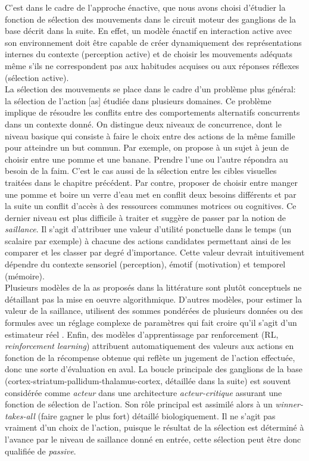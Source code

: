C'est dans le cadre de l'approche énactive, que nous avons choisi d'étudier la fonction de sélection des mouvements dans le circuit moteur des ganglions de la base décrit dans la suite. En effet, un modèle énactif en interaction active avec son environnement doit être capable de créer dynamiquement des représentations internes du contexte (perception active) et de choisir les mouvements adéquats même s'ils ne correspondent pas aux habitudes acquises ou aux réponses réflexes (sélection active).\\ 

La sélection des mouvements se place dans le cadre d'un problème plus général: la sélection de l'action [\gls{as}] étudiée dans plusieurs domaines. Ce problème implique de résoudre les conflits entre des comportements alternatifs concurrents dans un contexte donné. On distingue deux niveaux de concurrence, dont le niveau basique qui consiste à faire le choix entre des actions de la même famille pour atteindre un but commun. Par exemple, on propose à un sujet à jeun de choisir entre une pomme et une banane. Prendre l'une ou l'autre répondra au besoin de la faim. C'est le cas aussi de la sélection entre les cibles visuelles traitées dans le chapitre précédent. Par contre, proposer de choisir entre manger une pomme et boire un verre d'eau met en conflit deux besoins différents et par la suite un conflit d'accès à des ressources communes motrices ou cognitives. Ce dernier niveau est plus difficile à traiter et suggère de passer par la notion de \textit{saillance}. Il s'agit d'attribuer une valeur d'utilité ponctuelle dans le temps (un scalaire par exemple) à chacune des actions candidates permettant ainsi de les comparer et les classer par degré d'importance. Cette valeur devrait intuitivement dépendre du contexte sensoriel (perception), émotif (motivation) et temporel (mémoire).\\

Plusieurs modèles de la \gls{as} proposés dans la littérature sont plutôt conceptuels \cite{Brooks:1991, Rosenblatt:1995, It:1995} ne détaillant pas la mise en oeuvre algorithmique. D'autres modèles, pour estimer la valeur de la saillance, utilisent des sommes pondérées de plusieurs données ou des formules avec un réglage complexe de paramètres qui fait croire qu'il s'agit d'un estimateur réel \cite{Tyrrell:1993}. Enfin, des modèles d'apprentissage par renforcement (RL, \textit{reinforcement learning}) attribuent automatiquement des valeurs aux actions en fonction de la récompense obtenue qui reflète un jugement de l'action effectuée, donc une sorte d'évaluation en aval. La boucle principale des ganglions de la base (cortex-striatum-pallidum-thalamus-cortex, détaillée dans la suite) est souvent considérée comme \textit{acteur} dans une architecture \textit{acteur-critique} assurant une fonction de sélection de l'action. Son rôle principal est assimilé alors à un \textit{winner-takes-all} (faire gagner le plus fort) détaillé biologiquement. Il ne s'agit pas vraiment d'un choix de l'action, puisque le résultat de la sélection est déterminé à l'avance par le niveau de saillance donné en entrée, cette sélection peut être donc qualifiée de \textit{passive}.\\ 

